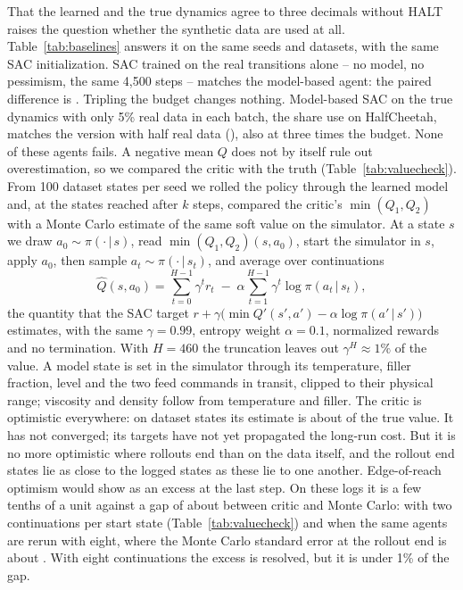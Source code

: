\documentclass[11pt]{article}
\begin{document}
That the learned and the true dynamics agree to three decimals without HALT raises the question whether the synthetic data are used at all. Table~\ref{tab:baselines} answers it on the same seeds and datasets, with the same SAC initialization. SAC trained on the real transitions alone -- no model, no pessimism, the same 4{,}500 steps -- matches the model-based agent: the paired difference is . Tripling the budget changes nothing. Model-based SAC on the true dynamics with only 5\% real data in each batch, the share \citet{sims2024edge} use on HalfCheetah, matches the version with half real data (), also at three times the budget. None of these agents fails. A negative mean $Q$ does not by itself rule out overestimation, so we compared the critic with the truth (Table~\ref{tab:valuecheck}). From 100 dataset states per seed we rolled the policy through the learned model and, at the states reached after $k$ steps, compared the critic's $\min(Q_1,Q_2)$ with a Monte Carlo estimate of the same soft value on the simulator. At a state $s$ we draw $a_0\sim\pi(\cdot\,|\,s)$, read $\min(Q_1,Q_2)(s,a_0)$, start the simulator in $s$, apply $a_0$, then sample $a_t\sim\pi(\cdot\,|\,s_t)$, and average over continuations
\[
\hat Q(s,a_0)=\sum_{t=0}^{H-1}\gamma^t r_t\;-\;\alpha\sum_{t=1}^{H-1}\gamma^t\log\pi(a_t\,|\,s_t),
\]
the quantity that the SAC target $r+\gamma\big(\min Q'(s',a')-\alpha\log\pi(a'\,|\,s')\big)$ estimates, with the same $\gamma=0.99$, entropy weight $\alpha=0.1$, normalized rewards and no termination. With $H=460$ the truncation leaves out $\gamma^{H}\approx1\%$ of the value. A model state is set in the simulator through its temperature, filler fraction, level and the two feed commands in transit, clipped to their physical range; viscosity and density follow from temperature and filler. The critic is optimistic everywhere: on dataset states its estimate is about \vcratiofull{} of the true value. It has not converged; its targets have not yet propagated the long-run cost. But it is no more optimistic where rollouts end than on the data itself, and the rollout end states lie as close to the logged states as these lie to one another. Edge-of-reach optimism would show as an excess at the last step. On these logs it is a few tenths of a unit against a gap of about \vcgapfull{} between critic and Monte Carlo: \vctwofull{} with two continuations per start state (Table~\ref{tab:valuecheck}) and \vceightfull{} when the same agents are rerun with eight, where the Monte Carlo standard error at the rollout end is about \vcsefull. With eight continuations the excess is resolved, but it is under 1\% of the gap.
\end{document}
